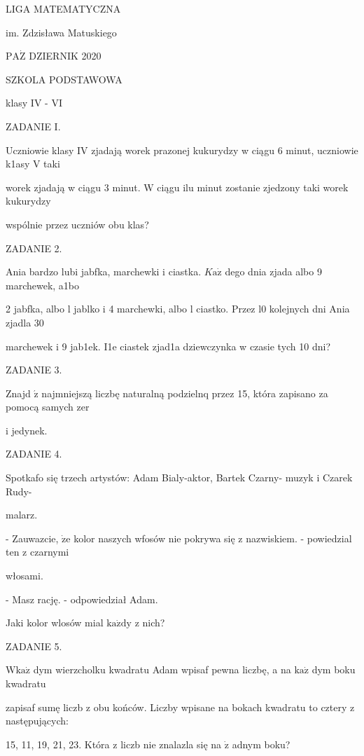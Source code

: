 \documentclass[a4paper,12pt]{article}
\begin{document}
LIGA MATEMATYCZNA

im. Zdzisława Matuskiego

$\mathrm{P}\mathrm{A}\dot{\mathrm{Z}}$ DZIERNIK 2020

SZKOLA PODSTAWOWA

klasy IV - VI

ZADANIE I.

Uczniowie klasy IV zjadają worek prazonej kukurydzy w ciągu 6 minut, uczniowie k1asy V taki

worek zjadają w ciągu 3 minut. $\mathrm{W}$ ciągu ilu minut zostanie zjedzony taki worek kukurydzy

wspólnie przez uczniów obu klas?

ZADANIE 2.

Ania bardzo lubi jabfka, marchewki i ciastka. $K\mathrm{a}\dot{\mathrm{z}}$ dego dnia zjada albo 9 marchewek, a1bo

2 jabfka, albo l jablko i 4 marchewki, albo l ciastko. Przez l0 kolejnych dni Ania zjadla 30

marchewek i 9 jab1ek. I1e ciastek zjad1a dziewczynka w czasie tych 10 dni?

ZADANIE 3.

Znajd $\acute{\mathrm{z}}$ najmniejszą liczbę naturalną podzielnq przez 15, która zapisano za pomocą samych zer

i jedynek.

ZADANIE 4.

Spotkafo się trzech artystów: Adam Bialy-aktor, Bartek Czarny- muzyk i Czarek Rudy-

malarz.

- Zauwazcie, $\dot{\mathrm{z}}\mathrm{e}$ kolor naszych wfosów nie pokrywa się z nazwiskiem. - powiedzial ten z czarnymi

włosami.

- Masz rację. - odpowiedział Adam.

Jaki kolor wlosów mial $\mathrm{k}\mathrm{a}\dot{\mathrm{z}}\mathrm{d}\mathrm{y}$ z nich?

ZADANIE 5.

$\mathrm{W} \mathrm{k}\mathrm{a}\dot{\mathrm{z}}$ dym wierzcholku kwadratu Adam wpisaf pewna liczbę, a na $\mathrm{k}\mathrm{a}\dot{\mathrm{z}}$ dym boku kwadratu

zapisaf sumę liczb z obu końców. Liczby wpisane na bokach kwadratu to cztery z następujących:

15, 11, 19, 21, 23. Która z liczb nie znalazla się na $\dot{\mathrm{z}}$ adnym boku?
\end{document}
